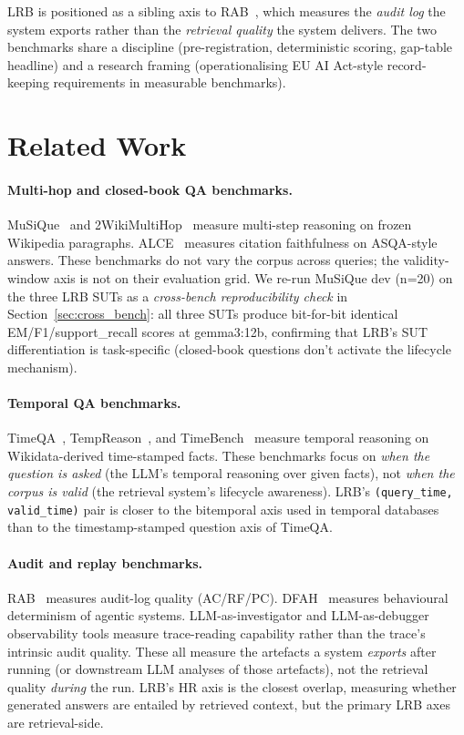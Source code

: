 \documentclass[11pt,a4paper]{article}
\begin{document}
LRB is positioned as a sibling axis to RAB~\cite{seo2026rab}, which measures the \emph{audit log} the system exports rather than the \emph{retrieval quality} the system delivers. The two benchmarks share a discipline (pre-registration, deterministic scoring, gap-table headline) and a research framing (operationalising EU AI Act-style record-keeping requirements in measurable benchmarks).

\section{Related Work}
\label{sec:related}

\paragraph{Multi-hop and closed-book QA benchmarks.} MuSiQue~\cite{trivedi2022musique} and 2WikiMultiHop~\cite{ho2020wikimultihop} measure multi-step reasoning on frozen Wikipedia paragraphs. ALCE~\cite{gao2023alce} measures citation faithfulness on ASQA-style answers. These benchmarks do not vary the corpus across queries; the validity-window axis is not on their evaluation grid. We re-run MuSiQue dev (n=20) on the three LRB SUTs as a \emph{cross-bench reproducibility check} in Section~\ref{sec:cross_bench}: all three SUTs produce bit-for-bit identical EM/F1/support\_recall scores at gemma3:12b, confirming that LRB's SUT differentiation is task-specific (closed-book questions don't activate the lifecycle mechanism).

\paragraph{Temporal QA benchmarks.} TimeQA~\cite{chen2021timeqa}, TempReason~\cite{tan2023tempreason}, and TimeBench~\cite{chu2024timebench} measure temporal reasoning on Wikidata-derived time-stamped facts. These benchmarks focus on \emph{when the question is asked} (the LLM's temporal reasoning over given facts), not \emph{when the corpus is valid} (the retrieval system's lifecycle awareness). LRB's \texttt{(query\_time, valid\_time)} pair is closer to the bitemporal axis used in temporal databases~\cite{snodgrass1995tsql} than to the timestamp-stamped question axis of TimeQA.

\paragraph{Audit and replay benchmarks.} RAB~\cite{seo2026rab} measures audit-log quality (AC/RF/PC). DFAH~\cite{khatchadourian2026dfah} measures behavioural determinism of agentic systems. LLM-as-investigator and LLM-as-debugger observability tools measure trace-reading capability rather than the trace's intrinsic audit quality. These all measure the artefacts a system \emph{exports} after running (or downstream LLM analyses of those artefacts), not the retrieval quality \emph{during} the run. LRB's HR axis is the closest overlap, measuring whether generated answers are entailed by retrieved context, but the primary LRB axes are retrieval-side.
\end{document}
